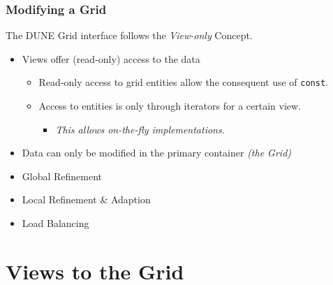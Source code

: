\documentclass[ignorenonframetext,11pt]{beamer}
\theoremstyle{definition}
\newcommand{\rightarrownice}{\tikz{%
    \draw[-latex,line width=2pt, color=structure.fg]   (0pt,0pt) -- +(2em,0) node[thin,right] {};}}
\begin{document}
\begin{frame} \frametitle{Modifying a Grid}
  The DUNE Grid interface follows the \emph{View-only} Concept.
  \pause
  \begin{itemize}
  \item Views offer (read-only) access to the data
    \begin{itemize}
    \item Read-only access to grid entities allow the consequent use of
      \lstinline!const!.
    \item Access to entities is only through iterators for a
      certain view.
      \begin{itemize}
      \item[\rightarrownice] \emph{This allows on-the-fly implementations.}
      \end{itemize}
    \end{itemize}
  \item  Data can only be modified in the primary container \emph{(the Grid)}
  \end{itemize}
  \pause
  \begin{itemize}
  \item  Global Refinement

  \item  Local Refinement \& Adaption

  \item  Load Balancing
  \end{itemize}
\end{frame}

\section{Views to the Grid}
\end{document}
